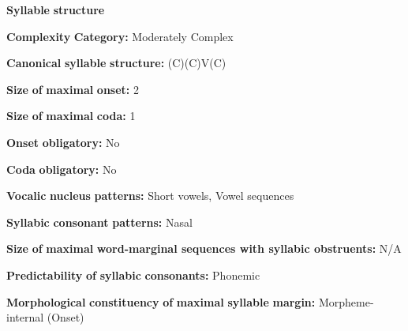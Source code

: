 \begin{styleBody}
\textbf{Syllable} \textbf{structure}
\end{styleBody}

\begin{styleBody}
\textbf{Complexity} \textbf{Category:} Moderately Complex
\end{styleBody}

\begin{styleBody}
\textbf{Canonical} \textbf{syllable} \textbf{structure:} (C)(C)V(C) \citep[38-9]{Ameka1991}
\end{styleBody}

\begin{styleBody}
\textbf{Size} \textbf{of} \textbf{maximal} \textbf{onset:} 2
\end{styleBody}

\begin{styleBody}
\textbf{Size} \textbf{of} \textbf{maximal} \textbf{coda:} 1
\end{styleBody}

\begin{styleBody}
\textbf{Onset} \textbf{obligatory:} No
\end{styleBody}

\begin{styleBody}
\textbf{Coda} \textbf{obligatory:} No
\end{styleBody}

\begin{styleBody}
\textbf{Vocalic} \textbf{nucleus} \textbf{patterns:} Short vowels, Vowel sequences
\end{styleBody}

\begin{styleBody}
\textbf{Syllabic} \textbf{consonant} \textbf{patterns:} Nasal
\end{styleBody}

\begin{styleBody}
\textbf{Size} \textbf{of} \textbf{maximal} \textbf{word{}-marginal sequences with syllabic obstruents:} N/A
\end{styleBody}

\begin{styleBody}
\textbf{Predictability} \textbf{of} \textbf{syllabic} \textbf{consonants:} Phonemic
\end{styleBody}

\begin{styleBody}
\textbf{Morphological} \textbf{constituency} \textbf{of} \textbf{maximal} \textbf{syllable} \textbf{margin:} Morpheme-internal (Onset)
\end{styleBody}

